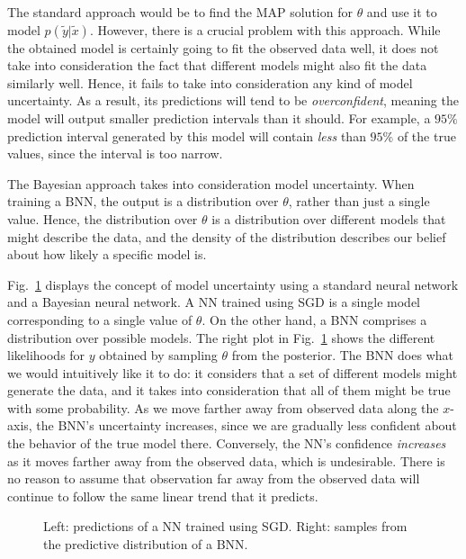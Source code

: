 \documentclass[12pt]{article}
\begin{document}
The standard approach would be to find the MAP solution for $\theta$ and use it to model $p(\tilde{y} | \tilde{x})$. However, there is a crucial problem with this approach. While the obtained model is certainly going to fit the observed data well, it does not take into consideration the fact that different models might also fit the data similarly well. Hence, it fails to take into consideration any kind of model uncertainty. As a result, its predictions will tend to be \textit{overconfident}, meaning the model will output smaller prediction intervals than it should. For example, a $95\%$ prediction interval generated by this model will contain \textit{less} than $95\%$ of the true values, since the interval is too narrow.

The Bayesian approach takes into consideration model uncertainty. When training a BNN, the output is a distribution over $\theta$, rather than just a single value. Hence, the distribution over $\theta$ is a distribution over different models that might describe the data, and the density of the distribution describes our belief about how likely a specific model is.

Fig.\ \ref{fig_1d_predictions_overlaid} displays the concept of model uncertainty using a standard neural network and a Bayesian neural network. A NN trained using SGD is a single model corresponding to a single value of $\theta$. On the other hand, a BNN comprises a distribution over possible models. The right plot in Fig.\ \ref{fig_1d_predictions_overlaid} shows the different likelihoods for $y$ obtained by sampling $\theta$ from the posterior. The BNN does what we would intuitively like it to do: it considers that a set of different models might generate the data, and it takes into consideration that all of them might be true with some probability. As we move farther away from observed data along the $x$-axis, the BNN's uncertainty increases, since we are gradually less confident about the behavior of the true model there. Conversely, the NN's confidence \textit{increases} as it moves farther away from the observed data, which is undesirable. There is no reason to assume that observation far away from the observed data will continue to follow the same linear trend that it predicts.

\begin{figure}[H]
\centering
{}
\caption{Left: predictions of a NN trained using SGD. Right: samples from the predictive distribution of a BNN.}
\label{fig_1d_predictions_overlaid}
\end{figure}
\end{document}
